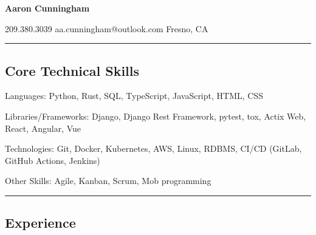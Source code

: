 \documentclass[11pt,letterpaper]{article}
\newenvironment{indentsection}[1]%
{\begin{list}{}%
    {\setlength{\leftmargin}{#1}}%
    \item[]%
}
{\end{list}}
\newcommand{\innerbullet}
{\hspace{0.6em}\textbullet\hspace{0.6em}}
\begin{document}
\begin{center}
    {\huge \textbf{Aaron Cunningham}}

    209.380.3039\innerbullet
    aa.cunningham@outlook.com\innerbullet
    Fresno, CA
\end{center}


\hrule
\vspace{-0.4em}
\subsection*{Core Technical Skills}

\begin{indentsection}{\parindent}
    \begin{description*}
        \item[Languages:]
            Python, Rust, SQL, TypeScript, JavaScript, HTML, CSS
        \item[Libraries/Frameworks:]
            Django, Django Rest Framework, pytest, tox, Actix Web, React, Angular, Vue
        \item[Technologies:]
            Git, Docker, Kubernetes, AWS, Linux, RDBMS, CI/CD (GitLab, GitHub Actions, Jenkins)
        \item[Other Skills:]
            Agile, Kanban, Scrum, Mob programming
    \end{description*}
\end{indentsection}


\hrule
\vspace{-0.4em}
\subsection*{Experience}
\end{document}
